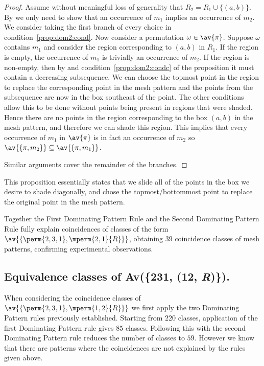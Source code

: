 \begin{proof}
    Assume without meaningful loss of generality that \(R_2 = R_1 \cup \{(a,b)\}\).
    By  we only need to show that an occurrence of \(m_1\)
    implies an occurrence of \(m_2\).
    We consider taking the first branch of every choice in condition~\eqref{prop:dom2:cond}.
    Now consider a permutation \(\omega \in \av{\pi}\). Suppose
    \(\omega\) contains \(m_1\) and consider the region corresponding to
    \((a,b)\) in \(R_1\). If the region is empty, the occurrence of \(m_1\) is trivially an occurrence
    of \(m_2\).
    If the region is non-empty, then by  and
    condition~\eqref{prop:dom2:condc} of the proposition it must contain
    a decreasing subsequence.
    We can choose the topmost point in the region to replace the corresponding
    point in the mesh pattern and the points from the subsequence are now in
    the box southeast of the point. The other conditions allow this to be done
    without points being present in regions that were shaded. Hence there are no
    points in the region corresponding to the box \((a,b)\) in the mesh
    pattern, and therefore we can shade this region. This implies that every
    occurrence of \(m_1\) in \(\av{\pi}\) is in fact an occurrence of \(m_2\)
    so \(\av{\{\pi,m_2\}} \subseteq \av{\{\pi,m_1\}}\).

    Similar arguments cover the remainder of the branches.
\end{proof}

This proposition essentially states that we slide all of the points in the box we desire
to shade diagonally, and chose the topmost/bottommost point to replace the original
point in the mesh pattern.

Together the First Dominating Pattern Rule and the Second Dominating
Pattern Rule fully explain coincidences of classes of the form
\(\av{\{\perm{2,3,1},\mperm{2,1}{R}\}}\), obtaining 39 coincidence classes of
mesh patterns, confirming experimental observations.

\subsection{Equivalence classes of Av(\{231, (12, \textit{R})\}).}
When considering the coincidence classes of \(\av{\{\perm{2,3,1},\mperm{1,2}{R}\}}\)
we first apply the two Dominating Pattern rules previously established.
Starting from \(220\) classes, application of the first Dominating Pattern rule
gives \(85\) classes. Following this with the second Dominating Pattern rule
reduces the number of classes to \(59\). However we know that there are patterns
where the coincidences are not explained by the rules given above.

